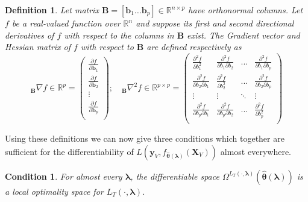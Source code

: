 \documentclass[12pt,letterpaper]{article}
\newtheorem{definition}{Definition}
\newtheorem{condition}{Condition}
\begin{document}
\begin{definition}
Let matrix $\boldsymbol B = [ \boldsymbol b_1 \hdots \boldsymbol b_p ] \in \mathbb{R}^{n \times p}$ have orthonormal columns. Let $f$ be a real-valued function over $\mathbb{R}^n$ and suppose its first and second directional derivatives of $f$ with respect to the columns in $\boldsymbol B$ exist. The Gradient vector and Hessian matrix of $f$ with respect to $\boldsymbol B$ are defined respectively as
\begin{equation}\label{eq:hess}
_{\boldsymbol B} \nabla f \in \mathbb{R}^{p} =
\left (
\begin{array}{c}
\frac{\partial f}{\partial \boldsymbol b_1} \\
\frac{\partial f}{\partial \boldsymbol b_2} \\
\vdots\\
\frac{\partial f}{\partial \boldsymbol b_p}\\
\end{array}
\right );
\quad
_{\boldsymbol B}\nabla^2 f \in \mathbb{R}^{p\times p} =
\left (
\begin{array}{cccc}
\frac{\partial^2 f}{\partial b_1^2} & \frac{\partial^2 f}{\partial b_1 \partial b_2} & ...  & \frac{\partial^2 f}{\partial b_1 \partial b_p} \\
\frac{\partial^2 f}{\partial b_2 \partial b_1} & \frac{\partial^2 f}{\partial b_2^2} & ...  & \frac{\partial^2 f}{\partial b_2 \partial b_p} \\
\vdots & \vdots &  \ddots & \vdots \\
\frac{\partial^2 f}{\partial b_p \partial b_1} & \frac{\partial^2 f}{\partial b_p \partial b_2} & ...  & \frac{\partial^2 f}{\partial b_p^2} \\
\end{array}
\right )
\end{equation}
\end{definition}

Using these definitions we can now give three conditions which together are sufficient for the differentiability of $L \left( \boldsymbol{y}_V, f_{\hat{\boldsymbol \theta}(\boldsymbol{\lambda})}(\boldsymbol{X}_V) \right )$ almost everywhere.

\begin{condition}
For almost every $\boldsymbol{\lambda}$, the differentiable space $\Omega^{L_T(\cdot, \boldsymbol{\lambda})}(\hat{\boldsymbol \theta}\left(\boldsymbol{\lambda}\right))$ is a local optimality space for $L_T\left(\cdot,\boldsymbol{\lambda}\right)$.
\end{condition}
\end{document}
